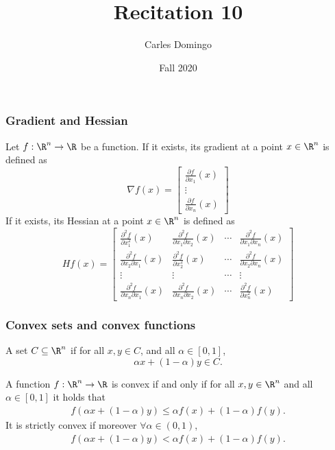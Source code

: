 \documentclass{beamer}
\title{Recitation 10}
\author{Carles Domingo}
\date{Fall 2020}
\begin{document}
\frame{\titlepage} 

\setcounter{showProgressBar}{0}
\setcounter{showSlideNumbers}{1}

\begin{frame}[t]
\frametitle{Gradient and Hessian}
\vspace{-10pt}
\begin{definition}
Let $f : \R^n \rightarrow \R$ be a function. If it exists, its gradient at a point $x \in \R^n$ is defined as
\begin{equation*} 
\nabla f(x) = 
\begin{bmatrix}
\frac{\partial f}{\partial x_1}(x) \\
\vdots \\
\frac{\partial f}{\partial x_n}(x)
\end{bmatrix}
\end{equation*}
If it exists, its Hessian at a point $x \in \R^n$ is defined as
\begin{equation*} 
H f(x) = 
\begin{bmatrix}
\frac{\partial^2 f}{\partial x_1^2}(x) & \frac{\partial^2 f}{\partial x_1 \partial x_2}(x) & \cdots & \frac{\partial^2 f}{\partial x_1 \partial x_n}(x) \\ 
\frac{\partial^2 f}{\partial x_2 \partial x_1}(x) & \frac{\partial^2 f}{\partial x_2^2}(x) & \cdots & \frac{\partial^2 f}{\partial x_2 \partial x_n}(x) \\ 
\vdots &  \vdots & \cdots & \vdots \\ 
\frac{\partial^2 f}{\partial x_n \partial x_1}(x) & \frac{\partial^2 f}{\partial x_n \partial x_2}(x) & \cdots & \frac{\partial^2 f}{\partial x_n^2}(x)
\end{bmatrix}
\end{equation*}
\end{definition}
\end{frame}

\begin{frame}[t]
\frametitle{Convex sets and convex functions}
\vspace{-10pt}
\begin{definition}
A set $C \subseteq \R^n$ if for all $x,y \in C$, and all $\alpha \in [0,1]$,
\begin{equation*} 
\alpha x + (1-\alpha) y \in C.
\end{equation*}
\end{definition}

\begin{definition}
A function $f : \R^n \rightarrow \R$ is convex if and only if for all $x, y \in \R^n$ and all $\alpha \in [0,1]$ it holds that 
\begin{align}
f(\alpha x + (1-\alpha) y) \leq \alpha f(x) + (1-\alpha) f(y).
\end{align}
It is strictly convex if moreover $\forall \alpha \in (0,1)$,
\begin{align}
f(\alpha x + (1-\alpha) y) < \alpha f(x) + (1-\alpha) f(y).
\end{align}
\end{definition}
\end{frame}
\end{document}
